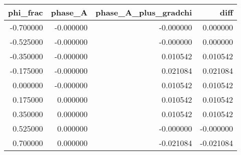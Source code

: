 \begin{tabular}{rrrr}
\toprule
phi_frac & phase_A & phase_A_plus_gradchi & diff \\
\midrule
-0.700000 & -0.000000 & -0.000000 & 0.000000 \\
-0.525000 & -0.000000 & -0.000000 & 0.000000 \\
-0.350000 & -0.000000 & 0.010542 & 0.010542 \\
-0.175000 & -0.000000 & 0.021084 & 0.021084 \\
0.000000 & -0.000000 & 0.010542 & 0.010542 \\
0.175000 & 0.000000 & 0.010542 & 0.010542 \\
0.350000 & 0.000000 & 0.010542 & 0.010542 \\
0.525000 & 0.000000 & -0.000000 & -0.000000 \\
0.700000 & 0.000000 & -0.021084 & -0.021084 \\
\bottomrule
\end{tabular}

